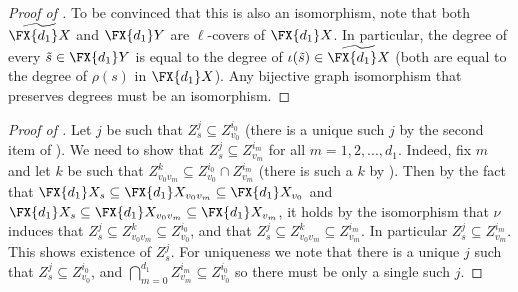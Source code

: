 \begin{proof}[Proof of ]
    To be convinced that this is also an isomorphism, note that both \(\widetilde{\FX{d_1}X}\) and \(\FX{d_1}Y\) are $\ell$-covers of \(\FX{d_1}X\). In particular, the degree of every \(\tilde{s} \in \FX{d_1}Y\) is equal to the degree of \(\iota(\tilde{s}) \in \widetilde{\FX{d_1}X}\) (both are equal to the degree of \(\rho(s)\) in \(\FX{d_1}X\)). Any bijective graph isomorphism that preserves degrees must be an isomorphism. 
\end{proof}

\begin{proof}[Proof of ]
    Let \(j\) be such that \(Z_s^j \subseteq Z_{v_0}^{i_0}\) (there is a unique such \(j\) by the second item of ). We need to show that \(Z_s^j \subseteq Z_{v_m}^{i_m}\) for all \(m=1,2,...,d_1\). Indeed, fix \(m\) and let \(k\) be such that \(Z_{v_0 v_m}^{k} \subseteq Z_{v_0}^{i_0} \cap Z_{v_m}^{i_m}\) (there is such a \(k\) by ). Then by the fact that \(\FX{d_1}X_{s} \subseteq \FX{d_1}X_{v_0 v_m} \subseteq \FX{d_1}X_{v_0}\) and \(\FX{d_1}X_{s} \subseteq \FX{d_1}X_{v_0 v_m} \subseteq \FX{d_1}X_{v_m}\), it holds by the isomorphism that \(\nu\) induces that \(Z_s^j \subseteq Z_{v_0 v_m}^k \subseteq Z_{v_0}^{i_0}\), and that \(Z_s^j \subseteq Z_{v_0 v_m}^k \subseteq Z_{v_m}^{i_m}\). In particular \(Z_s^j \subseteq Z_{v_m}^{i_m}\). This shows existence of \(Z_s^j\). For uniqueness we note that there is a unique \(j\) such that \(Z_s^j \subseteq Z_{v_0}^{i_0}\), and \(\bigcap_{m=0}^{d_1} Z_{v_m}^{i_m} \subseteq Z_{v_0}^{i_0}\) so there must be only a single such \(j\).
\end{proof}